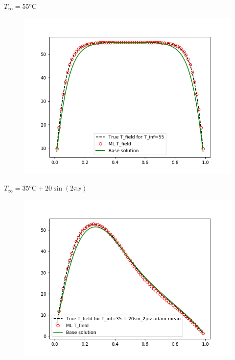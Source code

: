 \documentclass[10pt,
			   xcolor=svgnames,
			   hyperref={linkcolor=red, citecolor = DarkGreen, colorlinks=true, urlcolor=Navy}]{beamer}
\begin{document}
\begin{frame}
$T_\infty = \ang{55}$C 
\begin{figure}[H]
	\centering	
	\includegraphics[scale=0.5]{TBeta_True_vs_TBeta_ML_N_sample_=_5_T_inf_=_55.png}
\end{figure}

\end{frame}

\begin{frame}
$T_\infty = \ang{35} \text{C}  + 20\sin(2\pi x)$ 
\begin{figure}[H]
	\centering	
	\includegraphics[scale=0.5]{T_True_vs_T_ML_N_sample_5_T_inf_35_+_20sin_2piz_adam-mean.png}
\end{figure}
\end{frame}
\end{document}
